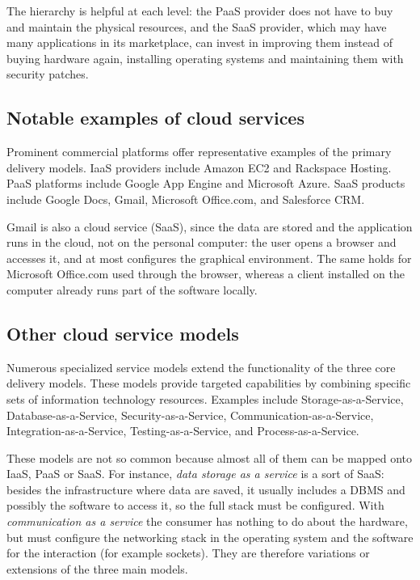 The hierarchy is helpful at each level: the PaaS provider does not have to buy and maintain the physical resources, and the SaaS provider, which may have many applications in its marketplace, can invest in improving them instead of buying hardware again, installing operating systems and maintaining them with security patches.

\begin{center}
\end{center}

\subsection{Notable examples of cloud services}

Prominent commercial platforms offer representative examples of the primary delivery models. IaaS providers include Amazon EC2 and Rackspace Hosting. PaaS platforms include Google App Engine and Microsoft Azure. SaaS products include Google Docs, Gmail, Microsoft Office.com, and Salesforce CRM.

Gmail is also a cloud service (SaaS), since the data are stored and the application runs in the cloud, not on the personal computer: the user opens a browser and accesses it, and at most configures the graphical environment. The same holds for Microsoft Office.com used through the browser, whereas a client installed on the computer already runs part of the software locally.

\subsection{Other cloud service models}

Numerous specialized service models extend the functionality of the three core delivery models. These models provide targeted capabilities by combining specific sets of information technology resources. Examples include Storage-as-a-Service, Database-as-a-Service, Security-as-a-Service, Communication-as-a-Service, Integration-as-a-Service, Testing-as-a-Service, and Process-as-a-Service.

These models are not so common because almost all of them can be mapped onto IaaS, PaaS or SaaS. For instance, \emph{data storage as a service} is a sort of SaaS: besides the infrastructure where data are saved, it usually includes a DBMS and possibly the software to access it, so the full stack must be configured. With \emph{communication as a service} the consumer has nothing to do about the hardware, but must configure the networking stack in the operating system and the software for the interaction (for example sockets). They are therefore variations or extensions of the three main models.

